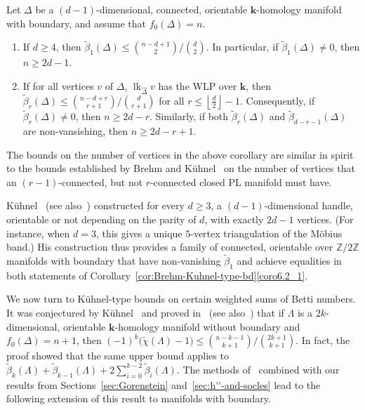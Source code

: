 \documentclass[ALCO,ThmDefs,Unicode,epreuves]{cedram}
\DeclareMathOperator\lk{lk}
\newcommand{\complet}[1]{\hat{#1}}
\newcommand{\field}{\mathbf{k}}
\newcommand{\Z}{{\mathbb Z}}
\newcommand{\halffloor}{\left\lfloor \frac{d}{2}\right\rfloor}
\begin{document}
\begin{coro} \label{cor:Brehm-Kuhnel-type-bd}
Let $\Delta$ be a $(d-1)$-dimensional, connected, orientable $\field$-homology manifold with boundary, and assume that $f_0(\Delta)=n$. 
\begin{enumerate}
\item\label{coro6.2_1} If $d\geq 4$, then $\tilde{\beta}_1(\Delta)\leq \binom{n-d+1}{2}/\binom{d}{2}$. In particular, if $\tilde{\beta}_1(\Delta)\neq 0$, then $n\geq 2d-1$.
\item\label{coro6.2_2} If for all vertices $v$ of $\Delta$, $\lk_{\complet{\Delta}}v$ has the WLP over $\field$, then $\tilde{\beta}_r(\Delta)\leq \binom{n-d+r}{r+1}/\binom{d}{r+1}$ for all $r\leq\halffloor-1$. Consequently, if $\tilde{\beta}_r(\Delta)\neq 0$, then $n\geq 2d-r$. Similarly, if both $\tilde{\beta}_r(\Delta)$ and $\tilde{\beta}_{d-r-1}(\Delta)$ are non-vansishing, then $n\geq 2d-r+1$.
\end{enumerate}
\end{coro}
The bounds on the number of vertices in the above corollary are similar in spirit to the bounds established by Brehm and K{\"u}hnel~\cite[Theorem~B]{Brehm-Kuhnel-87} on the number of vertices that an $(r-1)$-connected, but not $r$-connected closed PL manifold must have. 

\begin{exam} K{\"u}hnel~\cite{Kuhnel-86} (see also~\cite{Kuhnel-Lassmann-96}) constructed for every $d\geq 3$, a $(d-1)$-dimensional handle, orientable or not depending on the parity of $d$, with exactly $2d-1$ vertices. (For instance, when $d=3$, this gives a unique $5$-vertex triangulation of the M\"obius band.) His construction thus provides a family of connected, orientable over $\Z/2\Z$ manifolds with boundary that have non-vanishing $\tilde{\beta}_1$ and achieve equalities in both statements of Corollary~\ref{cor:Brehm-Kuhnel-type-bd}\eqref{coro6.2_1}. 
\end{exam}

We now turn to K{\"u}hnel-type bounds on certain weighted sums of Betti numbers. It was conjectured by K{\"u}hnel~\cite[Conjecture~B]{Kuhnel-95} and proved in~\cite[Theorem~4.4]{Novik-Swartz-09:Socles} (see also~\cite[Theorem~7.6]{Novik-98}) that if $\Lambda$ is a $2k$-dimensional, orientable $\field$-homology manifold without boundary and $f_0(\Delta)=n+1$, then $(-1)^k\big(\tilde{\chi}(\Lambda)-1\big)\leq\binom{n-k-1}{k+1}/\binom{2k+1}{k+1}$. In fact, the proof showed that the same upper bound applies to $\tilde{\beta}_k(\Lambda)+\tilde{\beta}_{k-1}(\Lambda)+2\sum_{i=0}^{k-2}\tilde{\beta}_i(\Lambda)$. The methods of~\cite{Novik-98,Novik-Swartz-09:Socles} combined with our results from Sections~\ref{sec:Gorenstein} and~\ref{sec:h''-and-socles} lead to the following extension of this result to manifolds with boundary.
\end{document}
